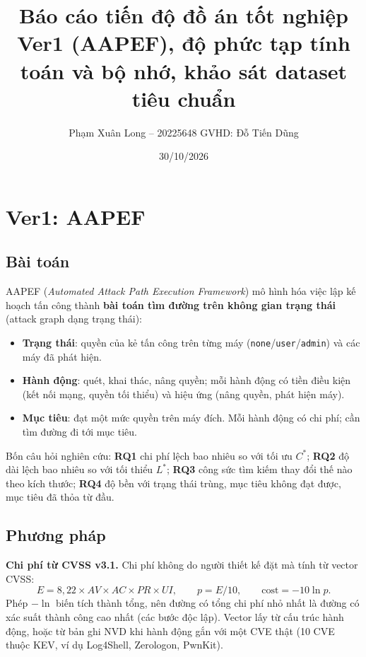 \documentclass[11pt,a4paper]{article}
\title{\textbf{Báo cáo tiến độ đồ án tốt nghiệp}\\[2pt]
\large Ver1 (AAPEF), độ phức tạp tính toán và bộ nhớ, khảo sát dataset tiêu chuẩn}
\author{Phạm Xuân Long -- 20225648 \quad GVHD: Đỗ Tiến Dũng}
\date{30/10/2026}
\begin{document}
\maketitle
\vspace{-0.8cm}

\section{Ver1: AAPEF}

\subsection{Bài toán}

AAPEF (\emph{Automated Attack Path Execution Framework}) mô hình hóa việc lập kế hoạch tấn công thành \textbf{bài toán tìm đường trên không gian trạng thái} (attack graph dạng trạng thái):
\begin{itemize}
  \item \textbf{Trạng thái}: quyền của kẻ tấn công trên từng máy (\texttt{none}/\texttt{user}/\texttt{admin}) và các máy đã phát hiện.
  \item \textbf{Hành động}: quét, khai thác, nâng quyền; mỗi hành động có tiền điều kiện (kết nối mạng, quyền tối thiểu) và hiệu ứng (nâng quyền, phát hiện máy).
  \item \textbf{Mục tiêu}: đạt một mức quyền trên máy đích. Mỗi hành động có chi phí; cần tìm đường đi tới mục tiêu.
\end{itemize}

Bốn câu hỏi nghiên cứu: \textbf{RQ1} chi phí lệch bao nhiêu so với tối ưu $C^{*}$; \textbf{RQ2} độ dài lệch bao nhiêu so với tối thiểu $L^{*}$; \textbf{RQ3} công sức tìm kiếm thay đổi thế nào theo kích thước; \textbf{RQ4} độ bền với trạng thái trùng, mục tiêu không đạt được, mục tiêu đã thỏa từ đầu.

\subsection{Phương pháp}

\textbf{Chi phí từ CVSS v3.1.} Chi phí không do người thiết kế đặt mà tính từ vector CVSS:
\[
E = 8{,}22 \times AV \times AC \times PR \times UI,\qquad p = E/10,\qquad \text{cost} = -10\ln p .
\]
Phép $-\ln$ biến tích thành tổng, nên đường có tổng chi phí nhỏ nhất là đường có xác suất thành công cao nhất (các bước độc lập). Vector lấy từ cấu trúc hành động, hoặc từ bản ghi NVD khi hành động gắn với một CVE thật (10 CVE thuộc KEV, ví dụ Log4Shell, Zerologon, PwnKit).
\end{document}
